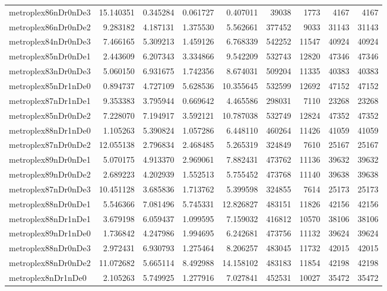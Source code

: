 \begin{longtable}{|l|r|r|r|r|r|r|r|r|}
metroplex86nDr0nDe3 & 15.140351 & 0.345284 & 0.061727 & 0.407011 & 39038 & 1773 & 4167 & 4167 \\
metroplex86nDr0nDe2 & 9.283182 & 4.187131 & 1.375530 & 5.562661 & 377452 & 9033 & 31143 & 31143 \\
metroplex84nDr0nDe3 & 7.466165 & 5.309213 & 1.459126 & 6.768339 & 542252 & 11547 & 40924 & 40924 \\
metroplex85nDr0nDe1 & 2.443609 & 6.207343 & 3.334866 & 9.542209 & 532743 & 12820 & 47346 & 47346 \\
metroplex83nDr0nDe3 & 5.060150 & 6.931675 & 1.742356 & 8.674031 & 509204 & 11335 & 40383 & 40383 \\
metroplex85nDr1nDe0 & 0.894737 & 4.727109 & 5.628536 & 10.355645 & 532599 & 12692 & 47152 & 47152 \\
metroplex87nDr1nDe1 & 9.353383 & 3.795944 & 0.669642 & 4.465586 & 298031 & 7110 & 23268 & 23268 \\
metroplex85nDr0nDe2 & 7.228070 & 7.194917 & 3.592121 & 10.787038 & 532749 & 12824 & 47352 & 47352 \\
metroplex88nDr1nDe0 & 1.105263 & 5.390824 & 1.057286 & 6.448110 & 460264 & 11426 & 41059 & 41059 \\
metroplex87nDr0nDe2 & 12.055138 & 2.796834 & 2.468485 & 5.265319 & 324849 & 7610 & 25167 & 25167 \\
metroplex89nDr0nDe1 & 5.070175 & 4.913370 & 2.969061 & 7.882431 & 473762 & 11136 & 39632 & 39632 \\
metroplex89nDr0nDe2 & 2.689223 & 4.202939 & 1.552513 & 5.755452 & 473768 & 11140 & 39638 & 39638 \\
metroplex87nDr0nDe3 & 10.451128 & 3.685836 & 1.713762 & 5.399598 & 324855 & 7614 & 25173 & 25173 \\
metroplex88nDr0nDe1 & 5.546366 & 7.081496 & 5.745331 & 12.826827 & 483151 & 11826 & 42156 & 42156 \\
metroplex88nDr1nDe1 & 3.679198 & 6.059437 & 1.099595 & 7.159032 & 416812 & 10570 & 38106 & 38106 \\
metroplex89nDr1nDe0 & 1.736842 & 4.247986 & 1.994695 & 6.242681 & 473756 & 11132 & 39624 & 39624 \\
metroplex88nDr0nDe3 & 2.972431 & 6.930793 & 1.275464 & 8.206257 & 483045 & 11732 & 42015 & 42015 \\
metroplex88nDr0nDe2 & 11.072682 & 5.665114 & 8.492988 & 14.158102 & 483183 & 11854 & 42198 & 42198 \\
metroplex8nDr1nDe0 & 2.105263 & 5.749925 & 1.277916 & 7.027841 & 452531 & 10027 & 35472 & 35472 \\

\end{longtable}
